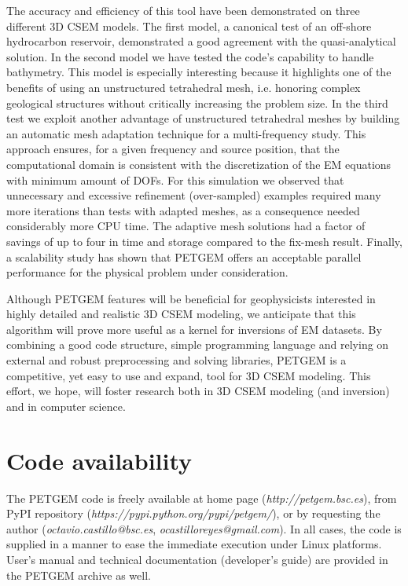 \documentclass[review]{elsarticle}
\begin{document}
The accuracy and efficiency of this tool have been demonstrated on three different 3D CSEM models. The first model, a canonical test of an off-shore hydrocarbon reservoir, demonstrated a good agreement with the quasi-analytical solution. In the second model we have tested the code's capability to handle bathymetry. This model is especially interesting because it highlights one of the benefits of using an unstructured tetrahedral mesh, i.e. honoring complex geological structures without critically increasing the problem size. In the third test we exploit another advantage of unstructured tetrahedral meshes by building an automatic mesh adaptation technique for a multi-frequency study. This approach ensures, for a given frequency and source position, that the computational domain is consistent with the discretization of the EM equations with minimum amount of DOFs. For this simulation we observed that unnecessary and excessive refinement (over-sampled) examples required many more iterations than tests with adapted meshes, as a consequence needed considerably more CPU time. The adaptive mesh solutions had a factor of savings of up to four in time and storage compared to the fix-mesh result. Finally, a scalability study has shown that PETGEM offers an acceptable parallel performance for the physical problem under consideration.

Although PETGEM features will be beneficial for geophysicists interested in highly detailed and realistic 3D CSEM modeling,  we anticipate that this algorithm will prove more useful as a kernel for inversions of EM datasets. By combining a good code structure, simple programming language and relying on external and robust preprocessing and solving libraries, PETGEM  is a competitive, yet easy to use and expand, tool for 3D CSEM modeling. This effort, we hope, will foster research both in 3D CSEM modeling (and inversion) and in computer science.

\section{Code availability}
The PETGEM code is freely available at home page (\textit{http://petgem.bsc.es}), from PyPI repository (\textit{https://pypi.python.org/pypi/petgem/}), or by requesting the author (\textit{octavio.castillo@bsc.es}, \textit{ocastilloreyes@gmail.com}). In all cases, the code is supplied in a manner to ease the immediate execution under Linux platforms. User's manual and technical documentation (developer's guide) are provided in the PETGEM  archive as well.
\end{document}
